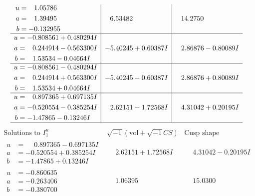 \documentclass[1p]{elsarticle_modified}
\theoremstyle{definition}
\newcommand{\I}{\sqrt{-1}}
\begin{document}
$$\begin{array}{c|c|c}
\begin{aligned}
u &= \phantom{-}1.05786\phantom{ +0.000000I} \\
a &= \phantom{-}1.39495\phantom{ +0.000000I} \\
b &= -0.132955\phantom{ +0.000000I}\end{aligned}
 & \phantom{-}6.53482\phantom{ +0.000000I} & \phantom{-}14.2750\phantom{ +0.000000I} \\ \hline\begin{aligned}
u &= -0.808561 + 0.480294 I \\
a &= \phantom{-}0.244914 - 0.563300 I \\
b &= \phantom{-}1.53534 - 0.04664 I\end{aligned}
 & -5.40245 + 0.60387 I & \phantom{-}2.86876 - 0.80089 I \\ \hline\begin{aligned}
u &= -0.808561 - 0.480294 I \\
a &= \phantom{-}0.244914 + 0.563300 I \\
b &= \phantom{-}1.53534 + 0.04664 I\end{aligned}
 & -5.40245 - 0.60387 I & \phantom{-}2.86876 + 0.80089 I \\ \hline\begin{aligned}
u &= \phantom{-}0.897365 + 0.697135 I \\
a &= -0.520554 - 0.385254 I \\
b &= -1.47865 - 0.13246 I\end{aligned}
 & \phantom{-}2.62151 - 1.72568 I & \phantom{-}4.31042 + 0.20195 I\\
 \hline 
 \end{array}$$\newpage$$\begin{array}{c|c|c}  
\text{Solutions to }I^u_{1}& \I (\text{vol} + \sqrt{-1}CS) & \text{Cusp shape}\\
 \hline 
\begin{aligned}
u &= \phantom{-}0.897365 - 0.697135 I \\
a &= -0.520554 + 0.385254 I \\
b &= -1.47865 + 0.13246 I\end{aligned}
 & \phantom{-}2.62151 + 1.72568 I & \phantom{-}4.31042 - 0.20195 I \\ \hline\begin{aligned}
u &= -0.860635\phantom{ +0.000000I} \\
a &= -0.263406\phantom{ +0.000000I} \\
b &= -0.380700\phantom{ +0.000000I}\end{aligned}
 & \phantom{-}1.06395\phantom{ +0.000000I} & \phantom{-}15.0300\phantom{ +0.000000I} \\ \hline\begin{aligned}

\end{aligned}
\end{array}$$
\end{document}
